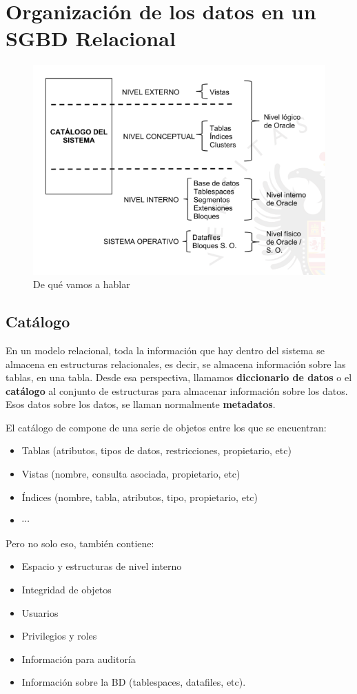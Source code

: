\chapter{Organización de los datos en un SGBD Relacional}


\begin{figure}[H]
  \center
  \includegraphics[scale=0.4]{img/8.png}
  \caption{De qué vamos a hablar}
\end{figure}

\section{Catálogo}

En un modelo relacional, toda la información que hay dentro del sistema se almacena en estructuras relacionales, es decir, se almacena información sobre las tablas, en una tabla. Desde esa perspectiva, llamamos \textbf{diccionario de datos} o el \textbf{catálogo} al conjunto de estructuras para almacenar información sobre los datos. Esos datos sobre los datos, se llaman normalmente \textbf{metadatos}.

El catálogo de compone de una serie de objetos entre los que se encuentran:
\begin{itemize}
\item Tablas (atributos, tipos de datos, restricciones, propietario, etc)
\item Vistas (nombre, consulta asociada, propietario, etc)
\item Índices (nombre, tabla, atributos, tipo, propietario, etc)
\item $\cdots$
\end{itemize}
Pero no solo eso, también contiene:
\begin{itemize}
\item Espacio y estructuras de nivel interno
\item Integridad de objetos
\item Usuarios
\item Privilegios y roles
\item Información para auditoría
\item Información sobre la BD (tablespaces, datafiles, etc).
\end{itemize}


